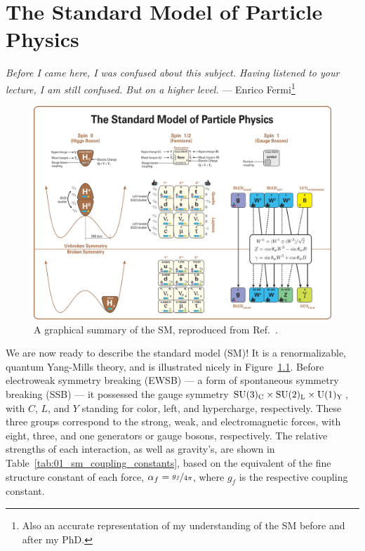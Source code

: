 
\chapter{The Standard Model of Particle Physics}
\label{sec:01_sm}

\begin{center}
	\centering
	\noindent
	\textit{Before I came here, I was confused about this subject. Having listened to your lecture, I am still confused. But on a higher level.} --- Enrico Fermi\footnote{Also an accurate representation of my understanding of the SM before and after my PhD.}
\end{center}


\begin{figure}
	\centering
	\captionsetup{justification=centering}
	\includegraphics[width=\textwidth]{figures/01-SM-03-SM/Standard_Model_Of_Particle_Physics--Most_Complete_Diagram.png}
	\caption{A graphical summary of the SM, reproduced from Ref.~\cite{SMMostCompleteDiagram}.}
	\label{fig:01_sm_summary}
\end{figure}

We are now ready to describe the standard model (SM)!
It is a renormalizable, quantum Yang-Mills theory, and is illustrated nicely in Figure~\ref{fig:01_sm_summary}.
Before electroweak symmetry breaking (EWSB) --- a form of spontaneous symmetry breaking (SSB) --- it possessed the gauge symmetry $\SU[3]_{\mathrm{C}} \times \SU[2]_{\mathrm{L}} \times \UU[1]_{\mathrm{Y}}$, with $C$, $L$, and $Y$ standing for color, left, and hypercharge, respectively.
These three groups correspond to the strong, weak, and electromagnetic forces, with eight, three, and one generators or gauge bosons, respectively.
The relative strengths of each interaction, as well as gravity's, are shown in Table~\ref{tab:01_sm_coupling_constants}, based on the equivalent of the fine structure constant of each force, $\alpha_f = \cnicefrac{g_f}{4\pi}$, where $g_f$ is the respective coupling constant.

